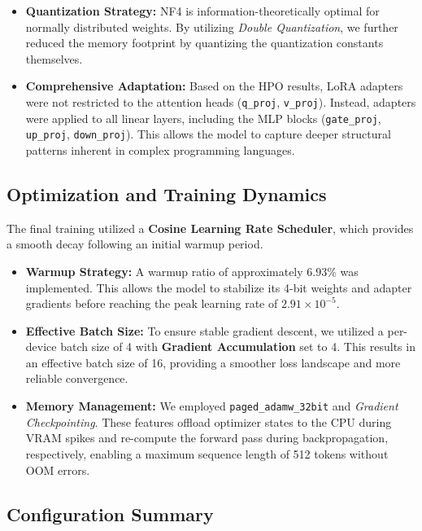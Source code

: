 \begin{itemize}
    \item \textbf{Quantization Strategy:} NF4 is information-theoretically optimal for normally distributed weights. By utilizing \textit{Double Quantization}, we further reduced the memory footprint by quantizing the quantization constants themselves.
    \item \textbf{Comprehensive Adaptation:} Based on the HPO results, LoRA adapters were not restricted to the attention heads (\texttt{q\_proj}, \texttt{v\_proj}). Instead, adapters were applied to all linear layers, including the MLP blocks (\texttt{gate\_proj}, \texttt{up\_proj}, \texttt{down\_proj}). This allows the model to capture deeper structural patterns inherent in complex programming languages.
\end{itemize}



\subsection{Optimization and Training Dynamics}
The final training utilized a \textbf{Cosine Learning Rate Scheduler}, which provides a smooth decay following an initial warmup period.

\begin{itemize}
    \item \textbf{Warmup Strategy:} A warmup ratio of approximately $6.93\%$ was implemented. This allows the model to stabilize its 4-bit weights and adapter gradients before reaching the peak learning rate of $2.91 \times 10^{-5}$.
    \item \textbf{Effective Batch Size:} To ensure stable gradient descent, we utilized a per-device batch size of 4 with \textbf{Gradient Accumulation} set to 4. This results in an effective batch size of 16, providing a smoother loss landscape and more reliable convergence.
    \item \textbf{Memory Management:} We employed \texttt{paged\_adamw\_32bit} and \textit{Gradient Checkpointing}. These features offload optimizer states to the CPU during VRAM spikes and re-compute the forward pass during backpropagation, respectively, enabling a maximum sequence length of 512 tokens without OOM errors.
\end{itemize}

\subsection{Configuration Summary}

